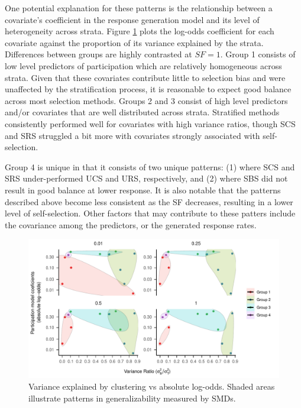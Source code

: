 \documentclass[
  english,
  man,floatsintext]{apa6}
\begin{document}
One potential explanation for these patterns is the relationship between a covariate's coefficient in the response generation model and its level of heterogeneity across strata.
Figure \ref{fig:fig-Var-Coef} plots the log-odds coefficient for each covariate against the proportion of its variance explained by the strata.
Differences between groups are highly contrasted at \(SF = 1\). Group 1 consists of low level predictors of participation which are relatively homogeneous across strata. Given that these covariates contribute little to selection bias and were unaffected by the stratification process, it is reasonable to expect good balance across most selection methods.
Groups 2 and 3 consist of high level predictors and/or covariates that are well distributed across strata. Stratified methods consistently performed well for covariates with high variance ratios, though SCS and SRS struggled a bit more with covariates strongly associated with self-selection.

Group 4 is unique in that it consists of two unique patterns: (1) where SCS and SRS under-performed UCS and URS, respectively, and (2) where SBS did not result in good balance at lower response. It is also notable that the patterns described above become less consistent as the SF decreases, resulting in a lower level of self-selection. Other factors that may contribute to these patters include the covariance among the predictors, or the generated response rates.



\begin{figure}
\centering
\includegraphics{6---Paper_files/figure-latex/fig-Var-Coef-1.pdf}
\caption{\label{fig:fig-Var-Coef}Variance explained by clustering vs absolute log-odds. Shaded areas illustrate patterns in generalizability measured by SMDs.}
\end{figure}
\end{document}
